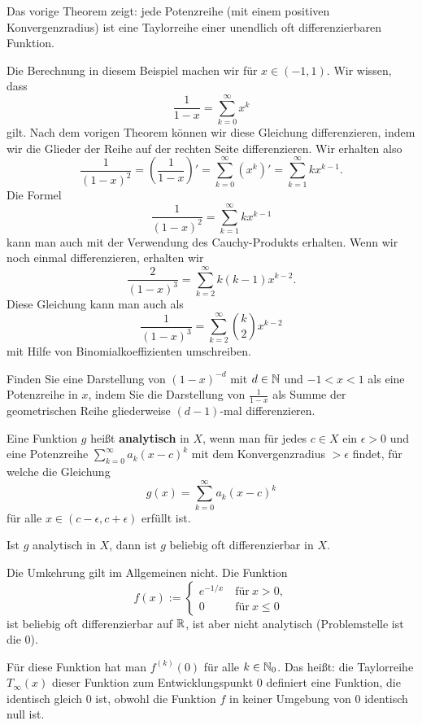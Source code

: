 \begin{bem}
	Das vorige Theorem zeigt: jede Potenzreihe (mit einem positiven Konvergenzradius) ist eine Taylorreihe einer unendlich oft differenzierbaren Funktion. 
\end{bem} 

\begin{bsp}
	Die Berechnung in diesem Beispiel machen wir für $x \in (-1,1)$. 
	Wir wissen, dass 
	\[
		\frac{1}{1-x} = \sum_{k=0}^\infty x^k
	\]
	gilt. Nach dem vorigen Theorem können wir diese Gleichung differenzieren, indem wir die Glieder der Reihe auf der rechten Seite differenzieren. Wir erhalten also 
	\[
		\frac{1}{(1-x)^2} = \left( \frac{1}{1-x} \right)' =  \sum_{k=0}^\infty (x^k)' = \sum_{k=1}^\infty k x^{k-1}. 
	\]
	Die Formel
	\[
		\frac{1}{(1-x)^2} = \sum_{k=1}^\infty k x^{k-1}
	\]
	kann man auch mit der Verwendung des Cauchy-Produkts erhalten. Wenn wir noch einmal differenzieren, erhalten wir 
	\[
		\frac{2}{(1-x)^3} =\sum_{k=2}^\infty k (k-1) x^{k-2}. 
	\]
	Diese Gleichung kann man auch als 
	\[
		\frac{1}{(1-x)^3} = \sum_{k=2}^\infty \binom{k}{2} x^{k-2} 
	\]
	mit Hilfe von Binomialkoeffizienten umschreiben. 
\end{bsp} 

\begin{aufg} 
	Finden Sie eine Darstellung von $(1-x)^{-d}$ mit $d \in \mathbb{N}$ und $-1 < x < 1$ als eine Potenzreihe in $x$, indem Sie die Darstellung von $\frac{1}{1-x}$ als Summe der geometrischen Reihe gliederweise $(d-1)$-mal differenzieren. 
\end{aufg} 

\begin{defn} 
	Eine Funktion $g$ heißt \textbf{analytisch} in $X$, wenn man für jedes $c \in X$ ein $\epsilon>0$ und eine Potenzreihe $\sum_{k=0}^\infty a_k (x-c)^k$ mit dem Konvergenzradius $> \epsilon$ findet, für welche die Gleichung
	\[	
			g(x) = \sum_{k=0}^\infty a_k (x-c)^k 
	\]
	für alle $x \in (c-\epsilon, c+ \epsilon)$ erfüllt ist. 
\end{defn} 

\begin{thm} 
	Ist $g$ analytisch in $X$, dann ist $g$ beliebig oft differenzierbar in $X$. 
\end{thm} 

\begin{bem} 
	Die Umkehrung gilt im Allgemeinen nicht. Die Funktion
	\[
		f(x) := \begin{cases} 
			e^{-1/x} & \ \text{für} \ x >0,
			\\ 0 & \ \text{für}  \ x \le 0
		\end{cases} 
	\]
	ist beliebig oft differenzierbar auf $\mathbb{R}$, ist aber nicht analytisch (Problemstelle ist die $0$). 
	
	Für diese Funktion hat man $f^{(k)}(0)$ für alle $k \in \mathbb{N}_0$. Das heißt: die Taylorreihe $T_\infty(x)$ dieser Funktion zum Entwicklungspunkt $0$ definiert eine Funktion, die identisch gleich $0$ ist, obwohl die Funktion $f$ in keiner Umgebung von $0$ identisch null ist. 
\end{bem} 

